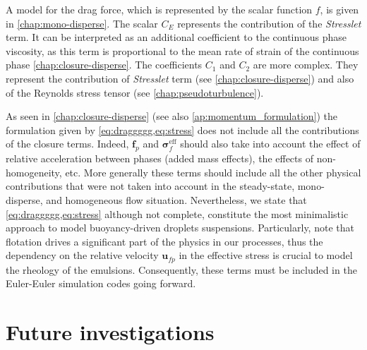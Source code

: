 A model for the drag force, which is represented by the scalar function $f$, is given in \ref{chap:mono-disperse}. 
The scalar $C_E$ represents the contribution of the \textit{Stresslet} term.
It can be interpreted as an additional coefficient to the continuous phase viscosity, as this term is proportional to the mean rate of strain of the continuous phase \eqref{chap:closure-disperse}.
The coefficients $C_1$ and $C_2$ are more complex. 
They represent the contribution of \textit{Stresslet} term (see \ref{chap:closure-disperse}) and also of the Reynolds stress tensor (see \ref{chap:pseudoturbulence}). 



As seen in \ref{chap:closure-disperse} (see also \ref{ap:momentum_formulation}) the formulation given by \ref{eq:draggggg,eq:stress} does not include all the contributions of the closure terms. 
Indeed, $\textbf{f}_p$ and $\bm\sigma_f^\text{eff}$ should also take into account the effect of relative acceleration between phases (added mass effects), the effects of non-homogeneity, etc.
More generally these terms should include all the other physical contributions that were not taken into account in the steady-state, mono-disperse, and homogeneous flow situation. 
Nevertheless, we state that \ref{eq:draggggg,eq:stress} although not complete, constitute the most minimalistic approach to model buoyancy-driven droplets suspensions. 
Particularly, note that flotation drives a significant part of the physics in our processes, thus the dependency on the relative velocity $\textbf{u}_{fp}$ in the effective stress is crucial to model the rheology of the emulsions.
Consequently, these terms must be included in the Euler-Euler simulation codes going forward.


\chapter*{Future investigations}


